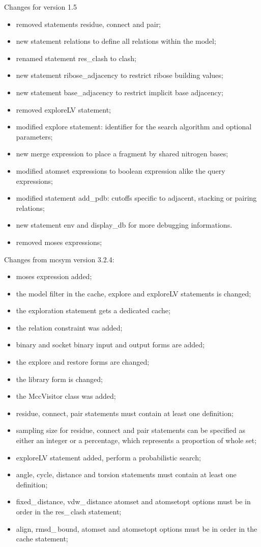 \documentclass[11pt]{article}
\begin{document}
Changes for version 1.5
\begin{itemize}
\item removed statements residue, connect and pair;
\item new statement relations to define all relations within the model;
\item renamed statement res\_clash to clash;
\item new statement ribose\_adjacency to restrict ribose building
  values;
\item new statement base\_adjacency to restrict implicit base
  adjacency;
\item removed exploreLV statement;
\item modified explore statement: identifier for the search algorithm
  and optional parameters;
\item new merge expression to place a fragment by shared nitrogen bases;
\item modified atomset expressions to boolean expression alike the
  query expressions;
\item modified statement add\_pdb: cutoffs specific to adjacent, stacking
  or pairing relations;
\item new statement env and display\_db for more debugging
  informations. 
\item removed moses expressions;
\end{itemize}

Changes from {\sc mcsym} version 3.2.4:
\begin{itemize}
\item moses expression added;
\item the model filter in the cache, explore and exploreLV statements is
  changed;
\item the exploration statement gets a dedicated cache;
\item the relation constraint was added;
\item binary and socket binary input and output forms are added;
\item the explore and restore forms are changed;
\item the library form is changed;
\item the MccVisitor class was added;
\item residue, connect, pair statements must contain at least one
  definition;
\item sampling size for residue, connect and pair statements can be specified
  as either an integer or a percentage, which represents a proportion
  of whole set;
\item exploreLV statement added, perform a probabilistic search;
\item angle, cycle, distance and torsion statements must contain at least
  one definition;
\item fixed\_\,distance, vdw\_\,distance atomset and atomsetopt options must
  be in order in the res\_\,clash statement;
\item align, rmsd\_\,bound, atomset and atomsetopt options must be in order
  in the cache statement;
\end{itemize}
\end{document}
